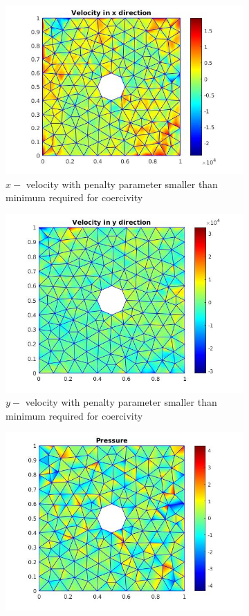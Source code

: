 \documentclass[a4paper,twoside,openright]{book}
\begin{document}
\begin{figure}
\begin{subfigure}{\textwidth}	
    \includegraphics[width=0.8\linewidth]{c11_unphysical_vx.jpg}
    \caption{$x-$ velocity with penalty parameter smaller than minimum required for coercivity}
    \label{x_vel_stoke_c11_low}
\end{subfigure}
\begin{subfigure}{\textwidth}	
    \includegraphics[width=0.8\linewidth]{c11_unphysical_vy.jpg}
    \caption{$y-$ velocity with penalty parameter smaller than minimum required for coercivity}
     \label{y_vel_stoke_c11_low}
\end{subfigure}
\begin{subfigure}{\textwidth}	
    \includegraphics[width=0.8\linewidth]{c11_unphysical_pressure.jpg}

\end{subfigure}
\end{figure}
\end{document}
